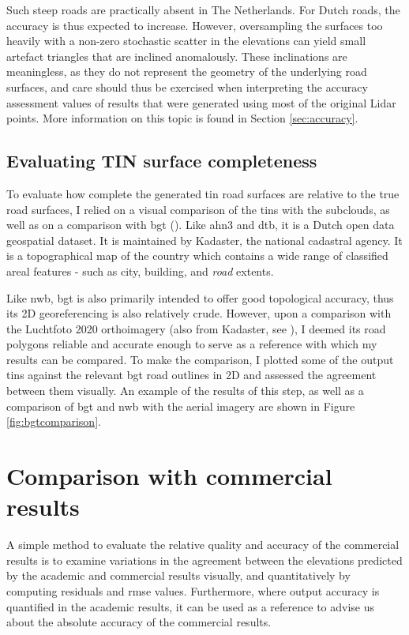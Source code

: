 Such steep roads are practically absent in The Netherlands. For Dutch roads, the accuracy is thus expected to increase. However, oversampling the surfaces too heavily with a non-zero stochastic scatter in the elevations can yield small artefact triangles that are inclined anomalously. These inclinations are meaningless, as they do not represent the geometry of the underlying road surfaces, and care should thus be exercised when interpreting the accuracy assessment values of results that were generated using most of the original Lidar points. More information on this topic is found in Section \ref{sec:accuracy}.

\subsection{Evaluating TIN surface completeness}
\label{sub:m_accuracycompleteness}

To evaluate how complete the generated \ac{tin} road surfaces are relative to the true road surfaces, I relied on a visual comparison of the \ac{tin}s with the subclouds, as well as on a comparison with \ac{bgt} (\cite{bgt_homepage}). Like \ac{ahn3} and \ac{dtb}, it is a Dutch open data geospatial dataset. It is maintained by Kadaster, the national cadastral agency. It is a topographical map of the country which contains a wide range of classified areal features - such as city, building, and \textit{road} extents.

Like \ac{nwb}, \ac{bgt} is also primarily intended to offer good topological accuracy, thus its 2D georeferencing is also relatively crude. However, upon a comparison with the Luchtfoto 2020 orthoimagery (also from Kadaster, see \cite{luchtfoto_pdok}), I deemed its road polygons reliable and accurate enough to serve as a reference with which my results can be compared. To make the comparison, I plotted some of the output \ac{tin}s against the relevant \ac{bgt} road outlines in 2D and assessed the agreement between them visually. An example of the results of this step, as well as a comparison of \ac{bgt} and \ac{nwb} with the aerial imagery are shown in Figure \ref{fig:bgtcomparison}.

\section{Comparison with commercial results}
\label{sec:m_comparison}

A simple method to evaluate the relative quality and accuracy of the commercial results is to examine variations in the agreement between the elevations predicted by the academic and commercial results visually, and quantitatively by computing residuals and \ac{rmse} values. Furthermore, where output accuracy is quantified in the academic results, it can be used as a reference to advise us about the absolute accuracy of the commercial results.

